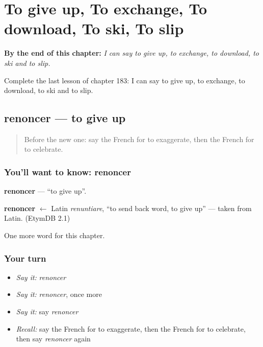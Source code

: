 
\chapter{To give up, To exchange, To download, To ski, To slip}
\label{ch:fr-to-give-up-to-exchange-to-download-to-ski-to-slip}

\begin{chapteropening}
\textbf{By the end of this chapter:} \emph{I can say to give up, to exchange, to download, to ski and to slip.}

Complete the last lesson of chapter 183: I can say to give up, to exchange, to download, to ski and to slip.
\end{chapteropening}

\section[renoncer]{renoncer — to give up}

\label{lesson:FR-C183-renoncer}



\begin{quote}
Before the new one: say the French for to exaggerate, then the French for to celebrate.
\end{quote}

\subsection*{You'll want to know: renoncer}
\textbf{renoncer} — \textquotedblleft{}to give up\textquotedblright{}.

\begin{cousinweb}
\textbf{renoncer} $\leftarrow$ Latin \emph{renuntiare}, \textquotedblleft{}to send back word, to give up\textquotedblright{} — taken from Latin. (EtymDB 2.1)
\end{cousinweb}

\begin{grammarlens}[title={What you've built}]
One more word for this chapter.
\end{grammarlens}

\subsection*{Your turn}
\begin{itemize}
\raggedright
  \item \emph{Say it:} \emph{renoncer}
  \item \emph{Say it:} \emph{renoncer}, once more
  \item \emph{Say it:} say \emph{renoncer}
  \item \emph{Recall:} say the French for to exaggerate, then the French for to celebrate, then say \emph{renoncer} again
\end{itemize}

